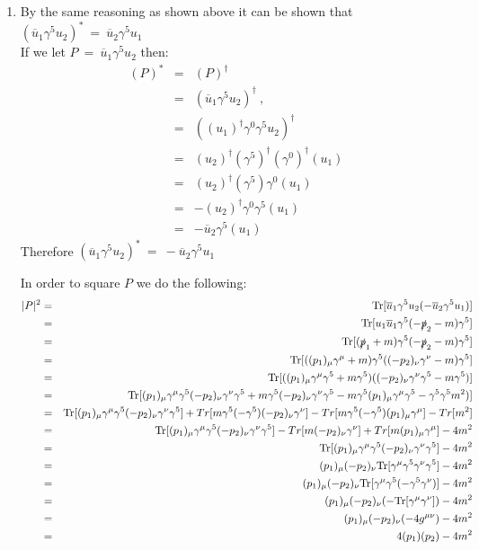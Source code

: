\documentclass[12pt]{article}
\def \bea{\begin{eqnarray}}
\def \eea{\end{eqnarray}}
\def \Tr{{\rm Tr}}
\def \nn{\nonumber}
\def \nl{\nn \\}
\def \ou{\overline{u}}
\def \ga{\gamma}
\begin{document}
\begin{enumerate}
\item  By the same reasoning as shown above it can be shown that $(\ou_1 \ga^5 u_2)^* ~=~ \ou_2 \ga^5 u_1$ \\
If we let $P ~=~ \ou_1\ga^5 u_2$ then:
\bea
(P)^* &=& (P)^\dag \\
&=& (\ou_1\ga^5 u_2)^\dag ~,~~ \nl
&=& ((u_1)^\dag\ga^0\ga^5 u_2)^\dag \nl
&=& (u_2)^\dag(\ga^5)^\dag (\ga^0)^\dag(u_1)\nl
&=& (u_2)^\dag(\ga^5) \ga^0(u_1)\nl
&=& -(u_2)^\dag \ga^0\ga^5(u_1)\nl
&=& -\ou_2\ga^5(u_1)
\eea
Therefore  $(\ou_1 \ga^5 u_2)^* ~=~ -\ou_2 \ga^5 u_1$

In order to square $P$ we do the following:
\bea
|P|^2&=& \Tr[\ou_1 \ga^5 u_2(-\ou_2 \ga^5 u_1)] \\
&=& \Tr[u_1 \ou_1 \ga^5(-\slashed{p}_2 - m) \ga^5] \nl
&=& \Tr[(\slashed{p}_1+m) \ga^5 (-\slashed{p}_2-m) \ga^5] \nl
&=& \Tr[((p_1)_\mu \ga^\mu+m) \ga^5 ((-p_2)_\nu\ga^\nu-m)  \ga^5] \nl
&=& \Tr[((p_1)_\mu \ga^\mu\ga^5+m\ga^5) ((-p_2)_\nu\ga^\nu\ga^5-m\ga^5)] \nl
&=& \Tr[(p_1)_\mu \ga^\mu\ga^5(-p_2)_\nu\ga^\nu\ga^5+ m\ga^5(-p_2)_\nu\ga^\nu\ga^5 -m\ga^5(p_1)_\mu \ga^\mu\ga^5 - \ga^5\ga^5m^2)] \nl
&=& \Tr[(p_1)_\mu \ga^\mu\ga^5(-p_2)_\nu\ga^\nu\ga^5] + Tr[ m\ga^5(-\ga^5)(-p_2)_\nu\ga^\nu] - Tr[m\ga^5(-\ga^5)(p_1)_\mu \ga^\mu] - Tr[m^2] \nl
&=& \Tr[(p_1)_\mu \ga^\mu\ga^5(-p_2)_\nu\ga^\nu\ga^5] -Tr[ m(-p_2)_\nu\ga^\nu] + Tr[m(p_1)_\mu \ga^\mu] - 4m^2 \nl
&=& \Tr[(p_1)_\mu \ga^\mu\ga^5(-p_2)_\nu\ga^\nu\ga^5] - 4m^2 \nl
&=& (p_1)_\mu(-p_2)_\nu \Tr[\ga^\mu\ga^5\ga^\nu\ga^5]- 4m^2 \nl
&=& (p_1)_\mu(-p_2)_\nu \Tr[\ga^\mu\ga^5(-\ga^5\ga^\nu)]- 4m^2\nl
&=& (p_1)_\mu(-p_2)_\nu (-\Tr[\ga^\mu\ga^\nu])- 4m^2\nl
&=& (p_1)_\mu(-p_2)_\nu (-4g^{\mu\nu})- 4m^2\nl
&=& 4(p_1)(p_2)- 4m^2
\eea
\end{enumerate}
\end{document}

